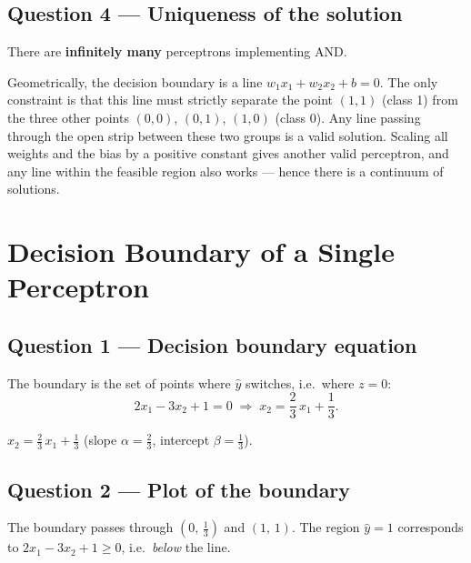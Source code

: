 \documentclass[11pt, a4paper]{article}
\begin{document}
\subsection*{Question 4 — Uniqueness of the solution}

\begin{tcolorbox}[solutionbox]
There are \textbf{infinitely many} perceptrons implementing AND.

Geometrically, the decision boundary is a line $w_1 x_1 + w_2 x_2 + b = 0$. The only constraint is that this line must strictly separate the point $(1,1)$ (class 1) from the three other points $(0,0)$, $(0,1)$, $(1,0)$ (class 0). Any line passing through the open strip between these two groups is a valid solution. Scaling all weights and the bias by a positive constant gives another valid perceptron, and any line within the feasible region also works — hence there is a continuum of solutions.
\end{tcolorbox}

\section{Decision Boundary of a Single Perceptron}

\subsection*{Question 1 — Decision boundary equation}

The boundary is the set of points where $\hat{y}$ switches, i.e.\ where $z = 0$:
\[
  2x_1 - 3x_2 + 1 = 0
  \;\Longrightarrow\;
  x_2 = \frac{2}{3}\,x_1 + \frac{1}{3}.
\]

\begin{tcolorbox}[answerbox, title={Answer}]
$\displaystyle x_2 = \frac{2}{3}\,x_1 + \frac{1}{3}$
\quad (slope $\alpha = \tfrac{2}{3}$, intercept $\beta = \tfrac{1}{3}$).
\end{tcolorbox}

\subsection*{Question 2 — Plot of the boundary}

The boundary passes through $(0,\,\tfrac{1}{3})$ and $(1,\,1)$.
The region $\hat{y}=1$ corresponds to $2x_1 - 3x_2 + 1 \geq 0$, i.e.\ \emph{below} the line.
\end{document}
